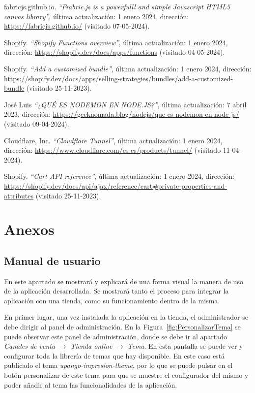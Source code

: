 \documentclass[11pt]{article}
\begin{document}
\begin{thebibliography}{100}
    fabricjs.github.io.
    \textit{``Frabric.js is a powerfulll and simple Javascript HTML5 canvas library''}, última actualización: 1 enero 2024, dirección: \url{https://fabricjs.github.io/} (visitado 07-05-2024).

    Shopify.
    \textit{``Shopify Functions overview''}, última actualización: 1 enero 2024, dirección: \url{https://shopify.dev/docs/apps/functions} (visitado 04-05-2024).

    Shopify.
    \textit{``Add a customized bundle''}, última actualización: 1 enero 2024, dirección: \url{https://shopify.dev/docs/apps/selling-strategies/bundles/add-a-customized-bundle} (visitado 25-11-2023).

    José Luis
    \textit{``¿QUÉ ES NODEMON EN NODE.JS?''}, última actualización: 7 abril 2023, dirección: \url{https://geeknomada.blog/nodejs/que-es-nodemon-en-node-js/} (visitado 09-04-2024).

    Cloudflare, Inc.
    \textit{``Cloudflare Tunnel''}, última actualización: 1 enero 2024, dirección: \url{https://www.cloudflare.com/es-es/products/tunnel/} (visitado 11-04-2024).

    Shopify.
    \textit{``Cart API reference''}, última actualización: 1 enero 2024, dirección: \url{https://shopify.dev/docs/api/ajax/reference/cart#private-properties-and-attributes} (visitado 25-11-2023).

\end{thebibliography}

\clearpage
\section{Anexos}

\subsection{Manual de usuario}\label{sec:manual}
En este apartado se mostrará y explicará de una forma visual la manera de uso de la aplicación desarrollada. Se mostrará tanto el proceso para integrar la aplicación con una tienda, como
su funcionamiento dentro de la misma.

En primer lugar, una vez instalada la aplicación en la tienda, el administrador se debe dirigir al panel de administración. En la Figura~\ref{fig:PersonalizarTema} se puede observar este panel de administración, donde
se debe ir al apartado \textit{Canales de venta} $\rightarrow$  \textit{Tienda online} $\rightarrow$  \textit{Tema}. En esta pantalla se puede ver y configurar toda la librería de temas que hay disponible.
En este caso está publicado el tema \textit{upango-impresion-theme}, por lo que se puede pulsar en el botón personalizar de este tema para que se muestre el configurador del mismo y poder
añadir al tema las funcionalidades de la aplicación.
\end{document}
